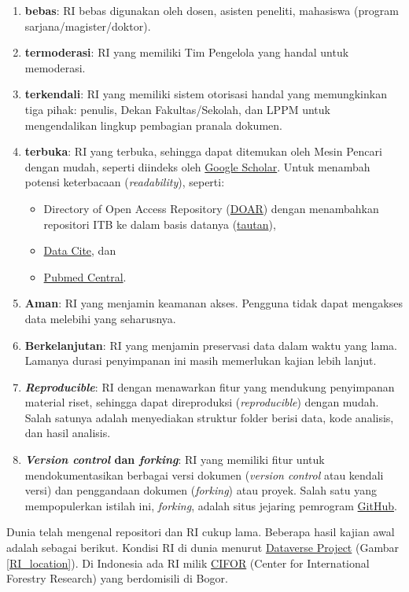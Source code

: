 \documentclass[a4paper]{article}
\begin{document}
\begin{enumerate}
\item \textbf{bebas}: RI bebas digunakan oleh dosen, asisten peneliti, mahasiswa (program sarjana/magister/doktor).
\item \textbf{termoderasi}: RI yang memiliki Tim Pengelola yang handal untuk memoderasi.
\item \textbf{terkendali}: RI yang memiliki sistem otorisasi handal yang memungkinkan tiga pihak: penulis, Dekan Fakultas/Sekolah, dan LPPM untuk mengendalikan lingkup pembagian pranala dokumen.
\item \textbf{terbuka}: RI yang terbuka, sehingga dapat ditemukan oleh Mesin Pencari dengan mudah, seperti diindeks oleh \href{scholar.google.com}{Google Scholar}. Untuk menambah potensi keterbacaan (\textit{readability}), seperti:

    \begin{itemize}
    \item Directory of Open Access Repository (\href{http://www.opendoar.org/}{DOAR}) dengan menambahkan repositori ITB ke dalam basis datanya (\href{http://www.opendoar.org/suggest.php}{tautan}),
    \item \href{http://datacite.org}{Data Cite}, dan 
    \item \href{https://www.ncbi.nlm.nih.gov/pmc/}{Pubmed Central}.
    \end{itemize}

\item \textbf{Aman}: RI yang menjamin keamanan akses. Pengguna tidak dapat mengakses data melebihi yang seharusnya. 

\item \textbf{Berkelanjutan}: RI yang menjamin preservasi data dalam waktu yang lama. Lamanya durasi penyimpanan ini masih memerlukan kajian lebih lanjut.

\item \textit{\textbf{Reproducible}}: RI dengan menawarkan fitur yang mendukung penyimpanan material riset, sehingga dapat direproduksi (\textit{reproducible}) dengan mudah. Salah satunya adalah menyediakan struktur folder berisi data, kode analisis, dan hasil analisis.

\item \textbf{\textit{Version control} dan \textit{forking}}: RI yang memiliki fitur untuk mendokumentasikan berbagai versi dokumen (\textit{version control} atau kendali versi) dan penggandaan dokumen (\textit{forking}) atau proyek. Salah satu yang mempopulerkan istilah ini, \textit{forking}, adalah situs jejaring pemrogram \href{http://github.com}{GitHub}.  
% 

\end{enumerate}
Dunia telah mengenal repositori dan RI cukup lama. Beberapa hasil kajian awal adalah sebagai berikut. Kondisi RI di dunia menurut \href{https://dataverse.org/}{Dataverse Project} (Gambar \ref{RI_location}). Di Indonesia ada RI milik \href{http://www.cofor.org}{CIFOR} (Center for International Forestry Research) yang berdomisili di Bogor.
\end{document}
